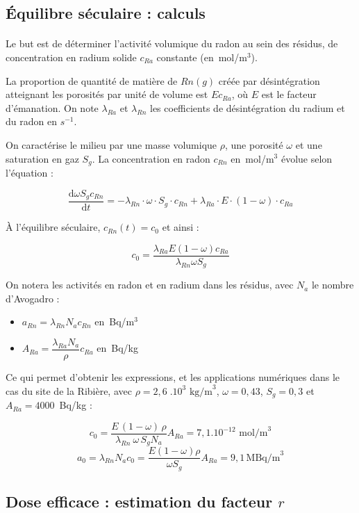 \documentclass{article}
\begin{document}
\subsection{Équilibre séculaire : calculs }
\label{annexe:seculaire}

\paragraph{} Le but est de déterminer l'activité volumique du radon au sein des résidus, de concentration en radium solide $c_{Ra}$ constante (en~mol/m$^3$).

La proportion de quantité de matière de $Rn(g)$ créée par désintégration atteignant les porosités par unité de volume est $E c_{Ra}$, où $E$ est le facteur d’émanation. On note $\lambda_{Ra}$ et $\lambda_{Rn}$ les coefficients de désintégration du radium et du radon en $s^{-1}$. 

On caractérise le milieu par une masse volumique $\rho$, une porosité $\omega$ et une saturation en gaz $S_g$. La concentration en radon $c_{Rn}$ en~mol/m$^3$ évolue selon l'équation :

$$
\frac{\text{d} \omega S_g c_{Rn}}{\text{d}t} = - \lambda_{Rn}\cdot \omega\cdot S_g \cdot c_{Rn} + \lambda_{Ra} \cdot E \cdot(1-\omega)\cdot c_{Ra}
$$

À l'équilibre séculaire, $c_{Rn}(t)=c_0$ et ainsi :

$$
c_0 = \frac{ \lambda_{Ra} E (1-\omega) c_{Ra} }{\lambda_{Rn} \omega S_g}
$$

On notera les activités en radon et en radium dans les résidus, avec $N_a$ le nombre d'Avogadro :
\begin{itemize}
  \item $a_{Rn}= \lambda_{Rn} N_a c_{Rn}$ en~Bq/m$^3$
  \item $A_{Ra}= \dfrac{\lambda_{Ra} N_a }{\rho} c_{Ra}$ en~Bq/kg
\end{itemize}

Ce qui permet d'obtenir les expressions, et les applications numériques dans le cas du site de la Ribière, avec $\rho = 2,6 \;.10^3 \text{ kg/m}^3$, $\omega= 0,43$, $S_g=0,3$ et $A_{Ra}=4 000$~Bq/kg :

$$
c_0 = \dfrac{ E \,(1-\omega)\, \rho }{\lambda_{Rn}\: \omega \,S_g N_a} A_{Ra} = 7,1.10^{-12} \text{ mol/m}^3
$$
$$
a_0=\lambda_{Rn} N_a c_0 =\frac{E(1-\omega)\rho}{\omega S_g} A_{Ra} =9,1 \, \text{MBq/m}^3
$$

\subsection{Dose efficace : estimation du facteur $r$}
\label{annexe:estimation_r}
\end{document}
